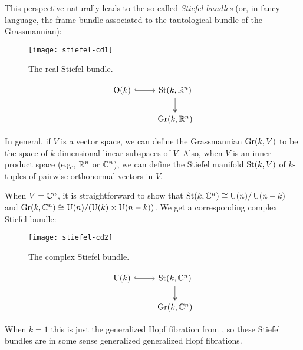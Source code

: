 This perspective naturally leads to the so-called \emph{Stiefel bundles} (or, in fancy language, the frame bundle associated to the tautological bundle of the Grassmannian):

\ifplastex
\begin{figure}[htbp]
	\centering
		\texttt{[image: stiefel-cd1]}
	\caption{The real Stiefel bundle.}
	\label{fig:stiefel-cd1}
\end{figure}
\else	
	\[
		\begin{tikzcd}
			\orthog(k)  \arrow[r,hook] & \St(k,\R^n) \arrow[d,two heads] \\
			 & \Gr(k,\R^n) 
		\end{tikzcd}
	\]
\fi

In general, if $V$ is a vector space, we can define the Grassmannian $\operatorname{Gr}(k,V)$ to be the space of $k$-dimensional linear subspaces of $V$. Also, when $V$ is an inner product space (e.g., $\mathbb{R}^n$ or $\mathbb{C}^n$), we can define the Stiefel manifold $\operatorname{St}(k,V)$ of $k$-tuples of pairwise orthonormal vectors in $V$. 

When $V = \mathbb{C}^n$, it is straightforward to show that $\operatorname{St}(k,\mathbb{C}^n) \cong \operatorname{U}(n)/\operatorname{U}(n-k)$ and $\operatorname{Gr}(k,\mathbb{C}^n) \cong \operatorname{U}(n)/(\operatorname{U}(k) \times \operatorname{U}(n-k))$. We get a corresponding complex Stiefel bundle:

\ifplastex
\begin{figure}[htbp]
	\centering
		\texttt{[image: stiefel-cd2]}
	\caption{The complex Stiefel bundle.}
	\label{fig:stiefel-cd2}
\end{figure}
\else	
	\[
		\begin{tikzcd}
			\U(k)  \arrow[r,hook] & \St(k,\C^n) \arrow[d,two heads] \\
			 & \Gr(k,\C^n) 
		\end{tikzcd}
	\]
\fi

When $k=1$ this is just the generalized Hopf fibration from , so these Stiefel bundles are in some sense generalized generalized Hopf fibrations.


